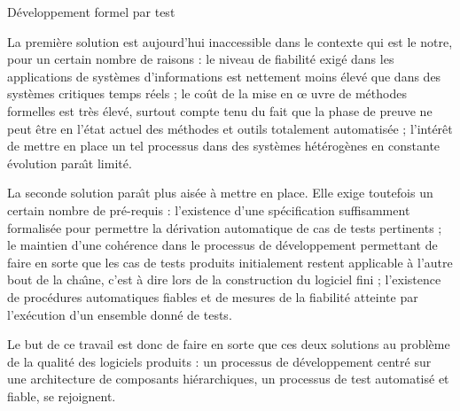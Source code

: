 \begin{floatingfigure}{.5\textwidth}
    \centering
    \caption{D\'eveloppement formel par test}
    \label{fig-process-test}
\end{floatingfigure}

La premi\`ere solution est aujourd'hui inaccessible dans le contexte
qui est le notre, pour un certain nombre de raisons : le niveau de
fiabilit\'e exig\'e dans les applications de syst\`emes
d'informations est nettement moins \'elev\'e que dans des
syst\`emes critiques temps r\'eels ; le co\^ut de la mise en \oe
uvre de m\'ethodes formelles est tr\`es \'elev\'e, surtout compte
tenu du fait que la phase de preuve ne peut \^etre en l'\'etat
actuel des m\'ethodes et outils totalement automatis\'ee ;
l'int\'er\^et de mettre en place un tel processus dans des
syst\`emes h\'et\'erog\`enes en constante \'evolution para\^{\i}t
limit\'e. 

La seconde solution para\^{\i}t plus ais\'ee \`a mettre en place. Elle
exige toutefois un certain nombre de pr\'e-requis : l'existence d'une
sp\'ecification suffisamment formalis\'ee pour permettre la
d\'erivation automatique de cas de tests pertinents ; le maintien
d'une coh\'erence dans le processus de d\'eveloppement permettant de
faire en sorte que les cas de tests produits initialement restent
applicable \`a l'autre bout de la cha\^{\i}ne, c'est \`a dire lors de
la construction du logiciel fini ; l'existence de proc\'edures
automatiques fiables et de mesures de la fiabilit\'e atteinte par
l'ex\'ecution d'un ensemble donn\'e de tests. 

Le but de ce travail est donc de faire en sorte que ces deux solutions
au probl\`eme de la qualit\'e des logiciels produits : un processus
de d\'eveloppement centr\'e sur une architecture de composants
hi\'erarchiques, un processus de test automatis\'e et fiable, se
rejoignent.

    